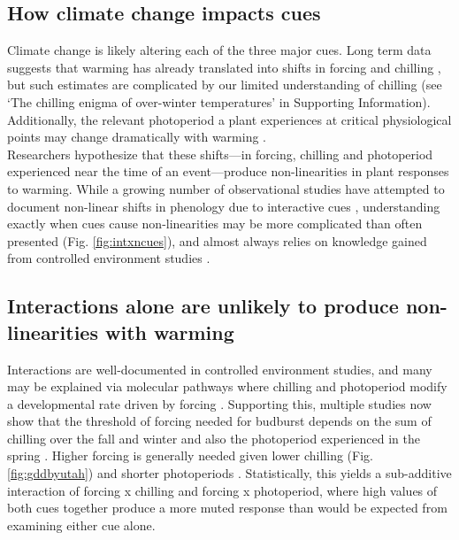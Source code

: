 \documentclass[11pt,letter]{article}
\newcommand{\R}[1]{\label{#1}\linelabel{#1}}
\begin{document}
\subsection{How climate change impacts cues}
Climate change is likely altering each of the three major cues. Long term data suggests that warming has already translated into shifts in forcing and chilling \citep{fu2015,piao2017}, but such estimates are complicated by our limited understanding of chilling (see `The chilling enigma of over-winter temperatures' in Supporting Information). Additionally, the relevant photoperiod a plant experiences at critical physiological points may change dramatically with warming \citep{ospreephoto}. \\ %

Researchers hypothesize that these shifts---in forcing, chilling and photoperiod experienced near the time of an event---produce non-linearities in plant responses to warming. While a growing number of observational studies have attempted to document non-linear shifts in phenology due to interactive cues \citep{fu2015,gauzere2019}, understanding exactly when cues cause non-linearities may be more complicated than often presented (Fig. \ref{fig:intxncues}), and almost always relies on knowledge gained from controlled environment studies \citep[e.g.,][]{fu2015,richardson2018,gauzere2019}.

\subsection{Interactions alone are unlikely to produce non-linearities with warming}
Interactions are well-documented in controlled environment studies, \R{addmolecstart1}and many may be explained via molecular pathways where chilling and photoperiod modify a developmental rate driven by forcing \citep{Chew:2012pd}\R{addmolecend1}. Supporting this, multiple studies now show that the threshold of forcing needed for budburst depends on the sum of chilling over the fall and winter and also the photoperiod experienced in the spring \citep[e.g.,][]{zohner2014,flynn2018}. Higher forcing is generally needed given lower chilling (Fig. \ref{fig:gddbyutah}) and shorter photoperiods \citep{Basler:2014aa,fu2019}. Statistically, this yields a sub-additive interaction of forcing x chilling and forcing x photoperiod, where high values of both cues together produce a more muted response than would be expected from examining either cue alone.\\
\end{document}
